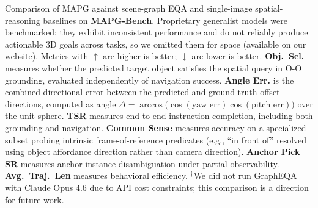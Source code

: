 \begin{table}[t]
\caption{Comparison of MAPG against scene-graph EQA and single-image spatial-reasoning baselines on \textbf{MAPG-Bench}.
Proprietary generalist models were benchmarked; they exhibit inconsistent performance and do not reliably produce actionable $3$D goals across tasks, so we omitted them for space (available on our website).
Metrics with $\uparrow$ are higher-is-better; $\downarrow$ are lower-is-better.
\textbf{Obj.\ Sel.} measures whether the predicted target object satisfies the spatial query in O-O grounding, evaluated independently of navigation success.
\textbf{Angle Err.} is the combined directional error between the predicted and ground-truth offset directions, computed as angle $\Delta = \arccos\!\big(\cos(\text{yaw err})\cos(\text{pitch err})\big)$ over the unit sphere.
\textbf{TSR} measures end-to-end instruction completion, including both grounding and navigation.
\textbf{Common Sense} measures accuracy on a specialized subset probing intrinsic frame-of-reference predicates (e.g., ``in front of'' resolved using object affordance direction rather than camera direction).
\textbf{Anchor Pick SR} measures anchor instance disambiguation under partial observability.
\textbf{Avg.\ Traj.\ Len} measures behavioral efficiency.
$^{\dagger}$We did not run GraphEQA with Claude Opus 4.6 due to API cost constraints; this comparison is a direction for future work.
}

\label{tab:mapg_bench}
\end{table}

